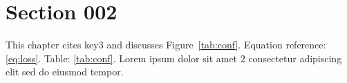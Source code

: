 \section{Section 002}\label{sec:s2}
This chapter cites key3 and discusses Figure~\ref{tab:conf}.
Equation reference: \eqref{eq:loss}. Table: \ref{tab:conf}.
Lorem ipsum dolor sit amet 2 consectetur adipiscing elit sed do eiusmod tempor.
